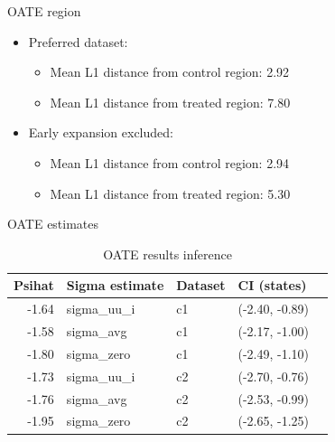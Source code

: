 \documentclass[hyperref={pdfpagelabels=false}]{beamer}
\begin{document}
\begin{frame}{OATE region}
    \begin{itemize}
        \item Preferred dataset: \bigskip
        \begin{itemize}
            \item Mean L1 distance from control region: 2.92 \bigskip
            \item Mean L1 distance from treated region: 7.80 \bigskip
        \end{itemize}
        \item Early expansion excluded: \bigskip
        \begin{itemize}
            \item Mean L1 distance from control region: 2.94 \bigskip
            \item Mean L1 distance from treated region: 5.30 \bigskip
        \end{itemize}
    \end{itemize}
\end{frame}

\begin{frame}{OATE estimates}
\begin{table}[ht]
\centering
\begin{tabular}{rllll}
  \toprule
Psihat & Sigma estimate & Dataset & CI (states) \\ 
  \midrule
  -1.64 & sigma\_uu\_i & c1 & (-2.40, -0.89) \\ 
  -1.58 & sigma\_avg & c1 & (-2.17, -1.00) \\ 
  -1.80 & sigma\_zero & c1 & (-2.49, -1.10) \\ 
  -1.73 & sigma\_uu\_i & c2 & (-2.70, -0.76) \\ 
  -1.76 & sigma\_avg & c2 & (-2.53, -0.99) \\ 
  -1.95 & sigma\_zero & c2 & (-2.65, -1.25) \\ 
   \bottomrule
\end{tabular}
\caption{OATE results inference}
\label{tab:oateconfint}
\end{table}
\end{frame}
\end{document}
